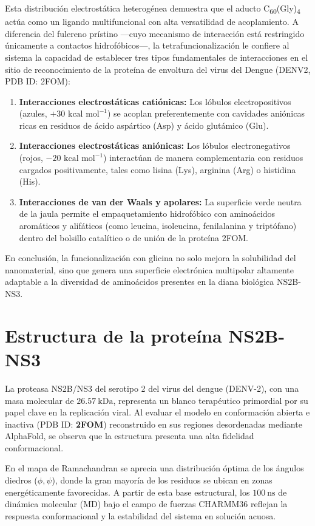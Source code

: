 Esta distribución electrostática heterogénea demuestra que el aducto C\textsubscript{60}(Gly)\textsubscript{4} actúa como un ligando multifuncional con alta versatilidad de acoplamiento. A diferencia del fulereno prístino —cuyo mecanismo de interacción está restringido únicamente a contactos hidrofóbicos—, la tetrafuncionalización le confiere al sistema la capacidad de establecer tres tipos fundamentales de interacciones en el sitio de reconocimiento de la proteína de envoltura del virus del Dengue (DENV2, PDB ID: 2FOM):
\begin{enumerate}
    \item \textbf{Interacciones electrostáticas catiónicas:} Los lóbulos electropositivos (azules, $+30\text{ kcal mol}^{-1}$) se acoplan preferentemente con cavidades aniónicas ricas en residuos de ácido aspártico (Asp) y ácido glutámico (Glu).
    \item \textbf{Interacciones electrostáticas aniónicas:} Los lóbulos electronegativos (rojos, $-20\text{ kcal mol}^{-1}$) interactúan de manera complementaria con residuos cargados positivamente, tales como lisina (Lys), arginina (Arg) o histidina (His).
    \item \textbf{Interacciones de van der Waals y apolares:} La superficie verde neutra de la jaula permite el empaquetamiento hidrofóbico con aminoácidos aromáticos y alifáticos (como leucina, isoleucina, fenilalanina y triptófano) dentro del bolsillo catalítico o de unión de la proteína 2FOM.
\end{enumerate}

En conclusión, la funcionalización con glicina no solo mejora la solubilidad del nanomaterial, sino que genera una superficie electrónica multipolar altamente adaptable a la diversidad de aminoácidos presentes en la diana biológica NS2B-NS3.       
        
\section{Estructura de la proteína NS2B-NS3}  
La proteasa NS2B/NS3 del serotipo 2 del virus del dengue (DENV-2), con una masa molecular de $26.57\ \text{kDa}$, representa un blanco terapéutico primordial por su papel clave en la replicación viral. Al evaluar el modelo en conformación abierta e inactiva (PDB ID: \textbf{2FOM}) reconstruido en sus regiones desordenadas mediante AlphaFold, se observa que la estructura presenta una alta fidelidad conformacional.

En el mapa de Ramachandran se aprecia una distribución óptima de los ángulos diedros ($\phi, \psi$), donde la gran mayoría de los residuos se ubican en zonas energéticamente favorecidas. A partir de esta base estructural, los $100\ \text{ns}$ de dinámica molecular (MD) bajo el campo de fuerzas CHARMM36 reflejan la respuesta conformacional y la estabilidad del sistema en solución acuosa.





